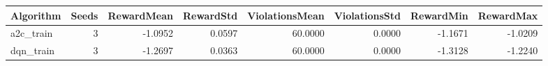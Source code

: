 \begin{tabular}{lrrrrrrr}
\toprule
Algorithm & Seeds & RewardMean & RewardStd & ViolationsMean & ViolationsStd & RewardMin & RewardMax \\
\midrule
a2c_train & 3 & -1.0952 & 0.0597 & 60.0000 & 0.0000 & -1.1671 & -1.0209 \\
dqn_train & 3 & -1.2697 & 0.0363 & 60.0000 & 0.0000 & -1.3128 & -1.2240 \\
\bottomrule
\end{tabular}

